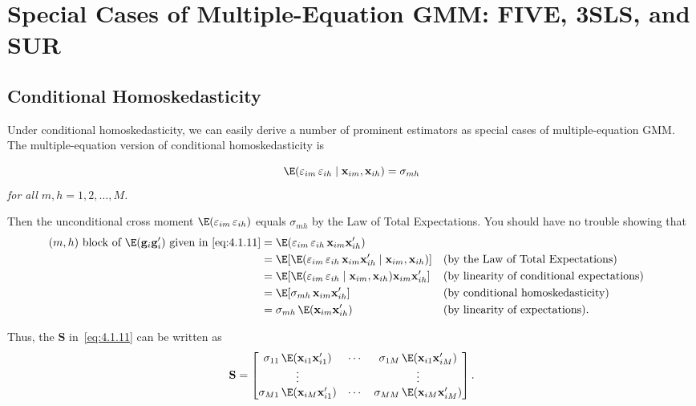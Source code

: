 
\section{Special Cases of Multiple-Equation GMM: FIVE, 3SLS, and SUR}
\label{sec:4.5}

\subsection*{Conditional Homoskedasticity}

Under conditional homoskedasticity, we can easily derive a number of prominent
estimators as special cases of multiple-equation GMM. The multiple-equation version
of conditional homoskedasticity is

\begin{assumption}
\label{ass:4.7}
\[
\E(\varepsilon_{im}\, \varepsilon_{ih} \mid \mathbf{x}_{im}, \mathbf{x}_{ih}) = \sigma_{mh}
\]
\textit{for all $m, h = 1, 2, \ldots, M$.}
\end{assumption}

Then the unconditional cross moment $\E(\varepsilon_{im}\, \varepsilon_{ih})$ equals
$\sigma_{mh}$ by the Law of Total Expectations. You should have no trouble showing that
\begin{align}
(m, h) \text{ block of } \E(\mathbf{g}_i \mathbf{g}_i') \text{ given in \eqref{eq:4.1.11}}
&= \E(\varepsilon_{im}\, \varepsilon_{ih}\, \mathbf{x}_{im} \mathbf{x}_{ih}') \notag \\
&= \E[\E(\varepsilon_{im}\, \varepsilon_{ih}\, \mathbf{x}_{im} \mathbf{x}_{ih}'
\mid \mathbf{x}_{im}, \mathbf{x}_{ih})]
&& \text{(by the Law of Total Expectations)} \notag \\
&= \E[\E(\varepsilon_{im}\, \varepsilon_{ih} \mid \mathbf{x}_{im}, \mathbf{x}_{ih})
\mathbf{x}_{im} \mathbf{x}_{ih}']
&& \text{(by linearity of conditional expectations)} \notag \\
&= \E[\sigma_{mh}\, \mathbf{x}_{im} \mathbf{x}_{ih}']
&& \text{(by conditional homoskedasticity)} \notag \\
&= \sigma_{mh}\, \E(\mathbf{x}_{im} \mathbf{x}_{ih}')
&& \text{(by linearity of expectations).}
\label{eq:4.5.1}
\end{align}

Thus, the $\mathbf{S}$ in~\eqref{eq:4.1.11} can be written as
\begin{equation}
\mathbf{S} = \begin{bmatrix}
\sigma_{11}\, \E(\mathbf{x}_{i1} \mathbf{x}_{i1}') & \cdots &
\sigma_{1M}\, \E(\mathbf{x}_{i1} \mathbf{x}_{iM}') \\
\vdots & & \vdots \\
\sigma_{M1}\, \E(\mathbf{x}_{iM} \mathbf{x}_{i1}') & \cdots &
\sigma_{MM}\, \E(\mathbf{x}_{iM} \mathbf{x}_{iM}')
\end{bmatrix}.
\label{eq:4.5.2}
\end{equation}


